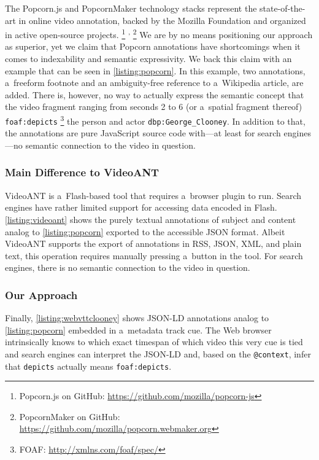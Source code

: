 \documentclass[runningheads,a4paper]{llncs}
\newcommand{\inlinelistingsize}{\fontsize{8pt}{11pt}}
\let\oldurl\url
\renewcommand{\url}[1]{\inlinelistingsize\oldurl{#1}}
\begin{document}
The Popcorn.js and PopcornMaker technology stacks
represent the state-of-the-art in online video annotation,
backed by the Mozilla Foundation
and organized in active open-source projects.%
\footnote{Popcorn.js on GitHub: \url{https://github.com/mozilla/popcorn-js}}%
\textsuperscript{,}%
\footnote{PopcornMaker on GitHub: \url{https://github.com/mozilla/popcorn.webmaker.org}}
We are by no means positioning our approach as superior,
yet we claim that Popcorn annotations have shortcomings
when it comes to indexability and semantic expressivity. 
We back this claim with an example
that can be seen in \autoref{listing:popcorn}.
In this example, two annotations, a~freeform footnote 
and an ambiguity-free reference to a~Wikipedia article, are added.
There is, however, no way to actually express the semantic concept
that the video fragment ranging from seconds 2 to 6 (or a~spatial fragment thereof) 
\texttt{foaf:depicts}%
\footnote{FOAF: \url{http://xmlns.com/foaf/spec/}} the person and actor
\texttt{dbp:George\_Clooney}.
In addition to that, the annotations are pure JavaScript source code
with---at least for search engines---no semantic connection
to the video in question.

\subsubsection{Main Difference to VideoANT}

VideoANT is a~Flash-based tool that requires a~browser plugin to run.
Search engines have rather limited support
for accessing data encoded in Flash.
\autoref{listing:videoant} shows the purely textual annotations
of subject and content analog to \autoref{listing:popcorn}
exported to the accessible JSON format.
Albeit VideoANT supports the export of annotations
in RSS, JSON, XML, and plain text,
this operation requires manually pressing a~button in the tool.
For search engines, there is no semantic connection
to the video in question.

\subsubsection{Our Approach}

Finally, \autoref{listing:webvttclooney} shows JSON-LD annotations
analog to \autoref{listing:popcorn} embedded in a~metadata track cue.
The Web browser intrinsically knows to which exact timespan
of which video this very cue is tied and search engines can interpret
the JSON-LD and, based on the \texttt{@context},
infer that \texttt{depicts} actually means \texttt{foaf:depicts}.
\end{document}
